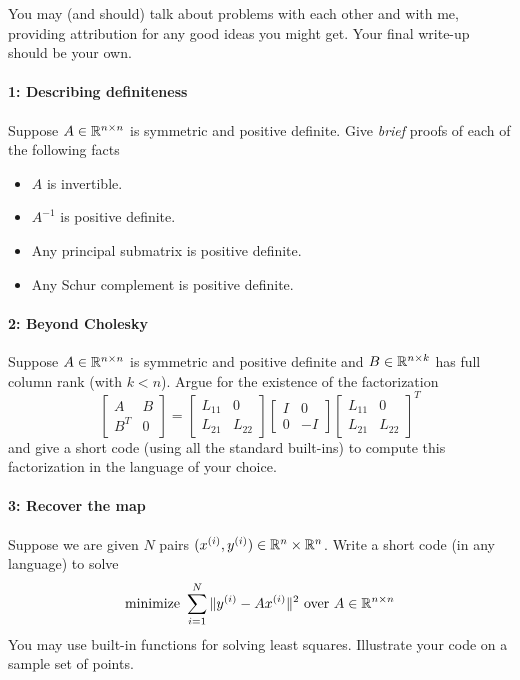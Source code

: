 \documentclass[12pt, leqno]{article} %
\begin{document}

You may (and should) talk about problems with each other and with me,
providing attribution for any good ideas you might get.  Your final
write-up should be your own.



\paragraph*{1: Describing definiteness}
Suppose $A \in \mathbb{R}^{n \times n}$ is symmetric and positive definite.
Give {\em brief} proofs of each of the following facts
\begin{itemize}
\item $A$ is invertible.
\item $A^{-1}$ is positive definite.
\item Any principal submatrix is positive definite.
\item Any Schur complement is positive definite.
\end{itemize}

\paragraph*{2: Beyond Cholesky}
Suppose $A \in \mathbb{R}^{n \times n}$ is symmetric and positive definite
and $B \in \mathbb{R}^{n \times k}$ has full column rank (with $k < n$).
Argue for the existence of the factorization
\[
  \begin{bmatrix} A & B \\ B^T & 0 \end{bmatrix} =
  \begin{bmatrix} L_{11} & 0 \\ L_{21} & L_{22} \end{bmatrix}
  \begin{bmatrix} I & 0 \\ 0 & -I \end{bmatrix}
  \begin{bmatrix} L_{11} & 0 \\ L_{21} & L_{22} \end{bmatrix}^T
\]
and give a short code (using all the standard built-ins) to
compute this factorization in the language of your choice.

\paragraph*{3: Recover the map}
Suppose we are given $N$ pairs
$(x^{(i)}, y^{(i)}) \in \mathbb{R}^n \times \mathbb{R}^n$.  Write a short
code (in any language) to solve
\[
  \mbox{minimize } \sum_{i=1}^N \|y^{(i)}-Ax^{(i)}\|^2
  \mbox{ over } A \in \mathbb{R}^{n \times n}
\]
You may use built-in functions for solving least squares.
Illustrate your code on a sample set of points.
\end{document}
